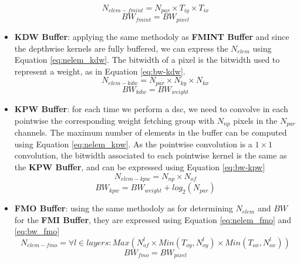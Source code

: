 \begin{itemize}
    \begin{equation}
        N_{elem-fmint} = N_{par} \times T_{iy} \times T_{ix}
        \label{eq:nelem_fmint}
    \end{equation}
    \begin{equation}
        BW_{fmint} = BW_{pixel}
        \label{eq:bw-fmint}
    \end{equation}
    \item \textbf{KDW Buffer}: applying the same methodoly as \textbf{FMINT Buffer} and since the depthwise kernels are fully buffered, we can express the $N_{elem}$ using Equation \eqref{eq:nelem_kdw}. The bitwidth of a pixel is the bitwidth used to represent a weight, as in Equation \eqref{eq:bw-kdw}.
    \begin{equation}
        N_{elem-kdw} = N_{par} \times N_{ky} \times N_{kx}
        \label{eq:nelem_kdw}
    \end{equation}
    \begin{equation}
        BW_{kdw} = BW_{weight}
        \label{eq:bw-kdw}
    \end{equation}
    \item \textbf{KPW Buffer}: for each time we perform a \acrshort{dsc}, we need to convolve in each pointwise the corresponding weight fetching group with $N_{np}$ pixels in the $N_{par}$ channels. The maximum number of elements in the buffer can be computed using Equation \eqref{eq:nelem_kpw}. As the pointwise convolution is a $1 \times 1$ convolution, the bitwidth associated to each pointwise kernel is the same as the \textbf{KPW Buffer}, and can be expressed using Equation \ref{eq:bw-kpw}
    \begin{equation}
        N_{elem-kpw} = N_{np} \times N_{of}
        \label{eq:nelem_kpw}
    \end{equation}
    \begin{equation}
        BW_{kpw} = BW_{weight} + log_2(N_{par})
        \label{eq:bw-kpw}
    \end{equation}
    \item \textbf{FMO Buffer}: using the same methodoly as for determining $N_{elem}$ and $BW$ for the \textbf{FMI Buffer}, they are expressed using Equation \eqref{eq:nelem_fmo} and \eqref{eq:bw_fmo}
    \begin{equation}
        N_{elem-fmo} = \forall l \in layers: Max\left( N_{of}^l \times Min\left(T_{oy}, N_{oy}^l\right) \times Min\left(T_{ox}, N_{ox}^l\right) \right)
        \label{eq:nelem_fmo}
    \end{equation}
    \begin{equation}
        BW_{fmo} = BW_{pixel}
        \label{eq:bw_fmo}
    \end{equation}
\end{itemize}
